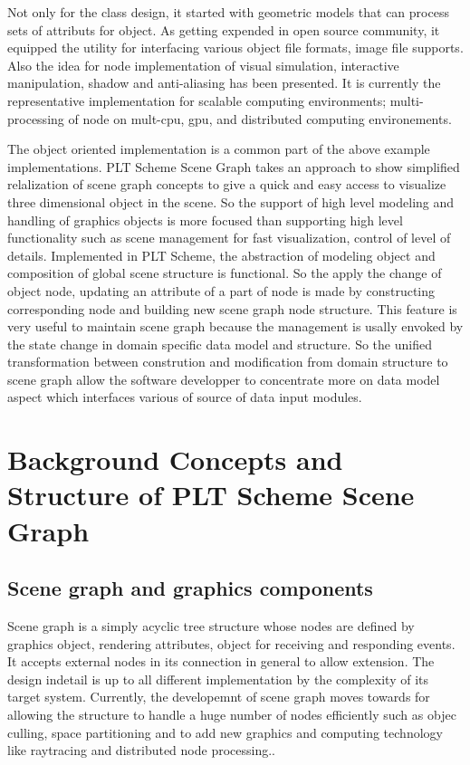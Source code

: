 \documentclass[preprint,nocopyrightspace]{sigplanconf}
\begin{document}
\begin{itemize}
Not only for the class design, it started with geometric models that can process sets of attributs for object. As getting expended in open source community, it equipped the utility for interfacing various object file formats, image file supports. Also the idea for node implementation of visual simulation, interactive manipulation, shadow and anti-aliasing has been presented. It is currently the representative implementation for scalable computing environments; multi-processing of node on mult-cpu, gpu, and distributed computing environements. 
\end{itemize}

The object oriented implementation is a common part of the above example implementations. PLT Scheme Scene Graph takes an approach to show simplified relalization of scene graph concepts to give a quick and easy access to visualize three dimensional object in the scene. So the support of high level modeling and handling of graphics objects is more focused than supporting high level functionality such as scene management for fast visualization, control of level of details. Implemented in PLT Scheme, the abstraction of modeling object and composition of global scene structure is functional. So the apply the change of object node, updating an attribute of a part of node is made by constructing corresponding node and building new scene graph node structure. This feature is very useful to maintain scene graph because the management is usally envoked by the state change in domain specific data model and structure. So the unified transformation between constrution and modification from domain structure to scene graph allow the software developper to concentrate more on data model aspect which interfaces various of source of data input modules.

\section{Background Concepts and Structure of PLT Scheme Scene Graph}
\subsection{Scene graph and graphics components}
Scene graph is a simply acyclic tree structure whose nodes are defined by graphics object, rendering attributes, object for receiving and responding events. It accepts external nodes in its connection in general to allow extension. The design indetail is up to all different implementation by the complexity of its target system. Currently, the developemnt of scene graph moves towards for allowing the structure to handle a huge number of nodes efficiently such as objec culling, space partitioning and to add new graphics and computing technology like raytracing and distributed node processing.\cite{OpenSceneGraph}. 
\end{document}
